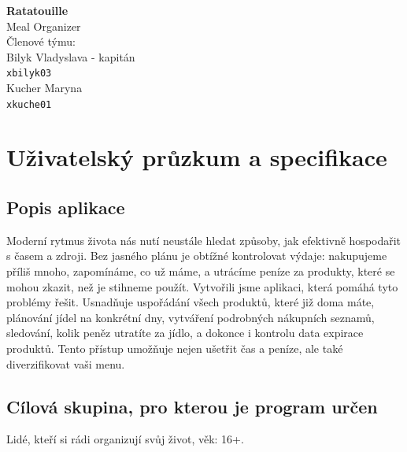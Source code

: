 \documentclass[a4paper,12pt]{article}
\begin{document}
\begin{titlepage}
    \centering
    \vspace*{\fill}
    {\LARGE \textbf{Ratatouille}}\\[0.3cm]
    Meal Organizer\\[1.5cm]
    Členové týmu:\\[0.5cm]
    Bilyk Vladyslava - kapitán \\
    \texttt{xbilyk03} \\[0.5cm]
    Kucher Maryna \\
    \texttt{xkuche01} 
    \vspace*{\fill}
\end{titlepage}

\newpage

\section*{Uživatelský průzkum a specifikace}

\subsection*{Popis aplikace}
    Moderní rytmus života nás nutí neustále hledat způsoby, jak efektivně hospodařit s časem a zdroji. Bez jasného plánu je obtížné kontrolovat výdaje: nakupujeme příliš mnoho, zapomínáme, co už máme, a utrácíme peníze za produkty, které se mohou zkazit, než je stihneme použít. Vytvořili jsme aplikaci, která pomáhá tyto problémy řešit. Usnadňuje uspořádání všech produktů, které již doma máte, plánování jídel na konkrétní dny, vytváření podrobných nákupních seznamů, sledování, kolik peněz utratíte za jídlo, a dokonce i kontrolu data expirace produktů. Tento přístup umožňuje nejen ušetřit čas a peníze, ale také diverzifikovat vaši menu.

\subsection*{Cílová skupina, pro kterou je program určen}
    Lidé, kteří si rádi organizují svůj život, věk: 16+.
    
\end{document}
